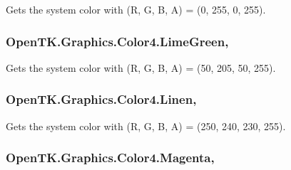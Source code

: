 Gets the system color with (R, G, B, A) = (0, 255, 0, 255). 

\hypertarget{struct_open_t_k_1_1_graphics_1_1_color4_aacd3eebc4269093bec58799f12449f67}{
\subsubsection[{Lime\-Green}]{ Open\-T\-K.\-Graphics.\-Color4.\-Lime\-Green\hspace{0.3cm}{\ttfamily [static]}, {\ttfamily [get]}}}\label{struct_open_t_k_1_1_graphics_1_1_color4_aacd3eebc4269093bec58799f12449f67}


Gets the system color with (R, G, B, A) = (50, 205, 50, 255). 

\hypertarget{struct_open_t_k_1_1_graphics_1_1_color4_a3f0c477d7d0344acead8948b4e10861a}{
\subsubsection[{Linen}]{ Open\-T\-K.\-Graphics.\-Color4.\-Linen\hspace{0.3cm}{\ttfamily [static]}, {\ttfamily [get]}}}\label{struct_open_t_k_1_1_graphics_1_1_color4_a3f0c477d7d0344acead8948b4e10861a}


Gets the system color with (R, G, B, A) = (250, 240, 230, 255). 

\hypertarget{struct_open_t_k_1_1_graphics_1_1_color4_aa88faac292b11b7bec104d892b8055a8}{
\subsubsection[{Magenta}]{ Open\-T\-K.\-Graphics.\-Color4.\-Magenta\hspace{0.3cm}{\ttfamily [static]}, {\ttfamily [get]}}}\label{struct_open_t_k_1_1_graphics_1_1_color4_aa88faac292b11b7bec104d892b8055a8}


